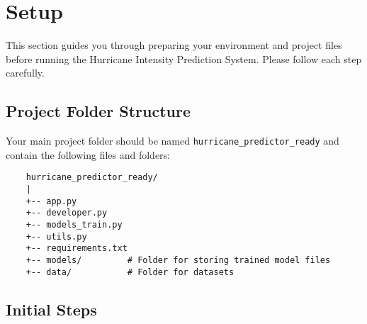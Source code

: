 %
%

\chapter{Setup}

This section guides you through preparing your environment and project files before running the Hurricane Intensity Prediction System. Please follow each step carefully.

\section*{Project Folder Structure}

Your main project folder should be named \texttt{hurricane\_predictor\_ready} and contain the following files and folders:

\begin{verbatim}
	hurricane_predictor_ready/
	|
	+-- app.py
	+-- developer.py
	+-- models_train.py
	+-- utils.py
	+-- requirements.txt
	+-- models/         # Folder for storing trained model files
	+-- data/           # Folder for datasets
\end{verbatim}

\section*{Initial Steps}

